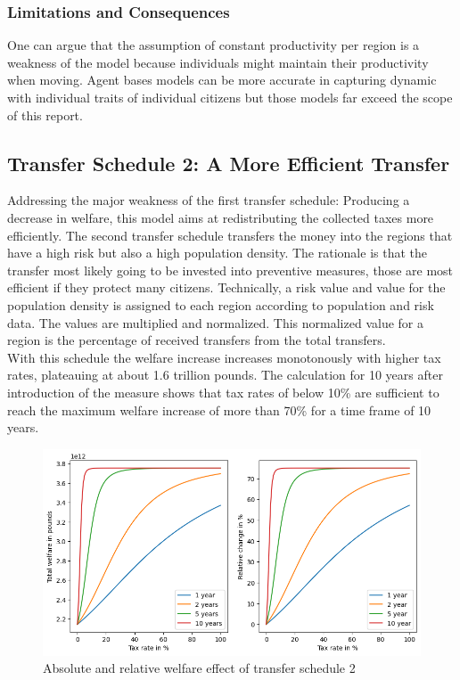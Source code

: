 \documentclass[10pt,a4paper]{article}
\begin{document}
\subsubsection{Limitations and Consequences}
One can argue that the assumption of constant productivity per region is a weakness of the model because individuals might maintain their productivity when moving. Agent bases models can be more accurate in capturing dynamic with individual traits of individual citizens but those models far exceed the scope of this report.
\\
\subsection{Transfer Schedule 2: A More Efficient Transfer}
Addressing the major weakness of the first transfer schedule: Producing a decrease in welfare, this model aims at redistributing the collected taxes more efficiently.
The second transfer schedule transfers the money into the regions that have a high risk but also a high population density. The rationale is that the transfer most likely going to be invested into preventive measures, those are most efficient if they protect many citizens.
Technically, a risk value and value for the population density is assigned to each region according to population and risk data. The values are multiplied and normalized. This normalized value for a region is the percentage of received transfers from the total transfers.
\\
With this schedule the welfare increase increases monotonously with higher tax rates, plateauing at about 1.6 trillion pounds. The calculation for 10 years after introduction of the measure shows that tax rates of below 10\% are sufficient to reach the maximum welfare increase of more than 70\% for a time frame of 10 years.
\begin{figure}[H]
    \centering
    \includegraphics[width=\textwidth]{Report/Schedule_2_graphics.png}
    \caption{Absolute and relative welfare effect of transfer schedule 2}
    \label{fig:sche2}
\end{figure}
\end{document}
